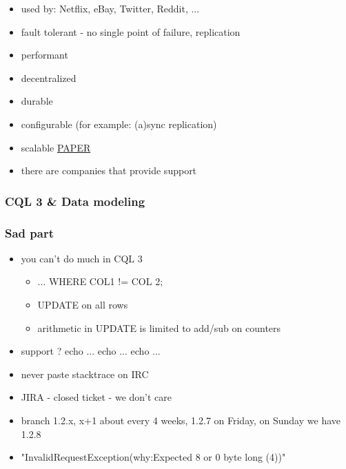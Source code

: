 \documentclass{beamer}
\begin{document}
\begin{frame}
\begin{itemize}
 \item used by: Netflix, eBay, Twitter, Reddit, ...
 \item fault tolerant - no single point of failure, replication
 \item performant
 \item decentralized
 \item durable
 \item configurable (for example: (a)sync replication)
 \item scalable \href{http://vldb.org/pvldb/vol5/p1724_tilmannrabl_vldb2012.pdf}{PAPER}
 \item there are companies that provide support
\end{itemize}
\end{frame}


\begin{frame}
    \frametitle{CQL 3 \& Data modeling}
\end{frame}


\begin{frame}
    \frametitle{Sad part}
    \begin{itemize}
        \item you can't do much in CQL 3
            \pause
        \begin{itemize}
            \item ... WHERE COL1 != COL 2;
                \pause
            \item UPDATE on all rows
                \pause
            \item arithmetic in UPDATE is limited to add/sub on counters
        \end{itemize}
            \pause
        \item support ? echo ... echo ... echo ...
            \pause
        \item never paste stacktrace on IRC
            \pause
        \item JIRA - closed ticket - we don't care
            \pause
        \item branch 1.2.x, x+1 about every 4 weeks, 1.2.7 on Friday, on Sunday we have 1.2.8
            \pause
        \item "InvalidRequestException(why:Expected 8 or 0 byte long (4))"
    \end{itemize}
\end{frame}
\end{document}
